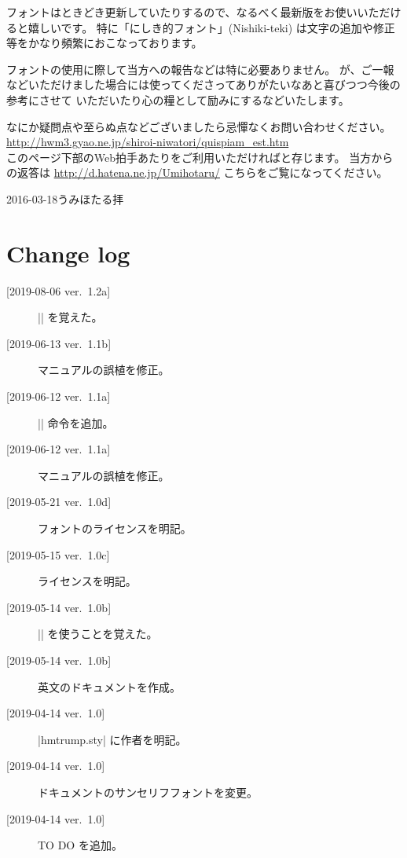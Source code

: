 \documentclass{jlreq}
\begin{document}
フォントはときどき更新していたりするので、なるべく最新版をお使いいただけると嬉しいです。
特に「にしき的フォント」(Nishiki-teki) は文字の追加や修正等をかなり頻繁におこなっております。

フォントの使用に際して当方への報告などは特に必要ありません。
が、ご一報などいただけました場合には使ってくださってありがたいなあと喜びつつ今後の参考にさせて
いただいたり心の糧として励みにするなどいたします。

なにか疑問点や至らぬ点などございましたら忌憚なくお問い合わせください。\\
\url{http://hwm3.gyao.ne.jp/shiroi-niwatori/quispiam_est.htm}\\
このページ下部のWeb拍手あたりをご利用いただければと存じます。
当方からの返答は \url{http://d.hatena.ne.jp/Umihotaru/} こちらをご覧になってください。


\hspace{3\zw}2016-03-18\hspace{1\zw}うみほたる拝
\egroup

\section{Change log}
\begin{description}
\item[{[2019-08-06 ver.~1.2a]}] |\newfontfamily| を覚えた。
\item[{[2019-06-13 ver.~1.1b]}] マニュアルの誤植を修正。
\item[{[2019-06-12 ver.~1.1a]}] |\unitrump| 命令を追加。
\item[{[2019-06-12 ver.~1.1a]}] マニュアルの誤植を修正。
\item[{[2019-05-21 ver.~1.0d]}] フォントのライセンスを明記。
\item[{[2019-05-15 ver.~1.0c]}] ライセンスを明記。
\item[{[2019-05-14 ver.~1.0b]}] |\@undefined| を使うことを覚えた。
\item[{[2019-05-14 ver.~1.0b]}] 英文のドキュメントを作成。
\item[{[2019-04-14 ver.~1.0]}] |hmtrump.sty| に作者を明記。
\item[{[2019-04-14 ver.~1.0]}] ドキュメントのサンセリフフォントを変更。
\item[{[2019-04-14 ver.~1.0]}] TO DO を追加。
\end{description}
\end{document}
